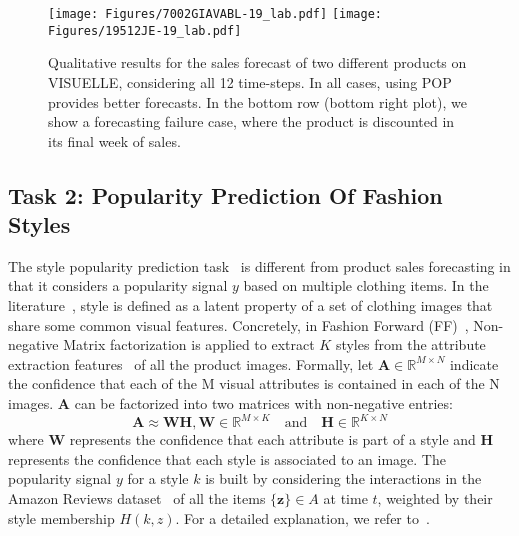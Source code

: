 \documentclass[runningheads]{llncs}
\begin{document}
\begin{figure}
    \centering
\texttt{[image: Figures/7002GIAVABL-19\_lab.pdf]}
    \texttt{[image: Figures/19512JE-19\_lab.pdf]}
    \caption{\footnotesize \label{fig:qlt_visuelle} Qualitative results for the sales forecast of two different products on VISUELLE, considering all 12 time-steps. In all cases, using POP provides better forecasts. In the bottom row (bottom right plot), we show a forecasting failure case, where the product is discounted in its final week of sales.}
    \vspace{-1cm}
\end{figure}



\subsection{Task 2: Popularity Prediction Of Fashion Styles}\label{sec:task2FF}
The style popularity prediction task~\cite{al2017fashion} is different from product sales forecasting in that it considers a popularity signal $y$ based on multiple clothing items. In the literature~\cite{al2017fashion,ma2020kern}, style is defined as a latent property of a set of clothing images that share some common visual features. Concretely, in Fashion Forward (FF)~\cite{al2017fashion}, Non-negative Matrix factorization is applied to extract $K$ styles from the attribute extraction features~\cite{liuLQWTcvpr16DeepFashion} of all the product images. Formally, let $\mathbf{A} \in \mathbb{R}^{M \times N}$ indicate the confidence that each of the M visual attributes is contained in each of the N images. $\mathbf{A}$ can be factorized into two matrices with non-negative entries:
\begin{equation}
    \mathbf{A} \approx \mathbf{W}\mathbf{H}, \mathbf{W} \in \mathbb{R}^{M\times K}\quad\textrm{and}\quad\mathbf{H} \in \mathbb{R}^{K\times N} 
\end{equation}
where $\mathbf{W}$ represents the confidence that each attribute is part of a style and $\mathbf{H}$ represents the confidence that each style is associated to an image. The popularity signal $y$ for a style $k$ is built by considering the interactions in the Amazon Reviews dataset~\cite{2015_amazonreviews} of all the items $\{\mathbf{z}\} \in A$ at time $t$, weighted by their style membership $H(k, z)$. For a detailed explanation, we refer to~\cite{al2017fashion}.
\end{document}

